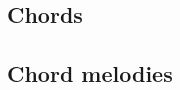 \documentclass{article}
\begin{document}
\subsection{Chords}

\subsection{Chord melodies}






\paragraph{}
%
%
\end{document}
